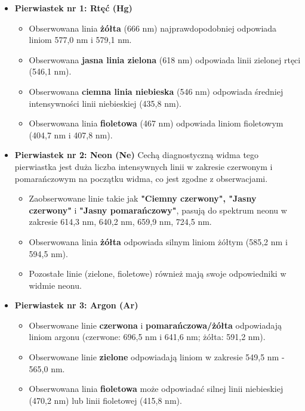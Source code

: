 \documentclass[a4paper,12pt]{article}
\begin{document}
\begin{itemize}
    \item \textbf{Pierwiastek nr 1: Rtęć (Hg)}
          \begin{itemize}
              \item Obserwowana linia \textbf{żółta} (666 nm) najprawdopodobniej odpowiada liniom 577,0 nm i 579,1 nm.
              \item Obserwowana \textbf{jasna linia zielona} (618 nm) odpowiada linii zielonej rtęci (546,1 nm).
              \item Obserwowana \textbf{ciemna linia niebieska} (546 nm) odpowiada średniej intensywności linii niebieskiej (435,8 nm).
              \item Obserwowana linia \textbf{fioletowa} (467 nm) odpowiada liniom fioletowym (404,7 nm i 407,8 nm).
          \end{itemize}

    \item \textbf{Pierwiastek nr 2: Neon (Ne)}
          Cechą diagnostyczną widma tego pierwiastka jest duża liczba intensywnych linii w zakresie czerwonym i pomarańczowym na początku widma, co jest zgodne z obserwacjami.
          \begin{itemize}
              \item Zaobserwowane linie takie jak \textbf{"Ciemny czerwony", "Jasny czerwony"} i \textbf{"Jasny pomarańczowy"}, pasują do spektrum neonu w zakresie 614,3 nm, 640,2 nm, 659,9 nm, 724,5 nm.
              \item Obserwowana linia \textbf{żółta} odpowiada silnym liniom żółtym (585,2 nm i 594,5 nm).
              \item Pozostałe linie (zielone, fioletowe) również mają swoje odpowiedniki w widmie neonu.
          \end{itemize}

    \item \textbf{Pierwiastek nr 3: Argon (Ar)}
          \begin{itemize}
              \item Obserwowane linie \textbf{czerwona} i \textbf{pomarańczowa/żółta} odpowiadają liniom argonu (czerwone: 696,5 nm i 641,6 nm; żółta: 591,2 nm).
              \item Obserwowane linie \textbf{zielone} odpowiadają liniom w zakresie 549,5 nm - 565,0 nm.
              \item Obserwowana linia \textbf{fioletowa} może odpowiadać silnej linii niebieskiej (470,2 nm) lub linii fioletowej (415,8 nm).
          \end{itemize}
\end{itemize}
\end{document}
